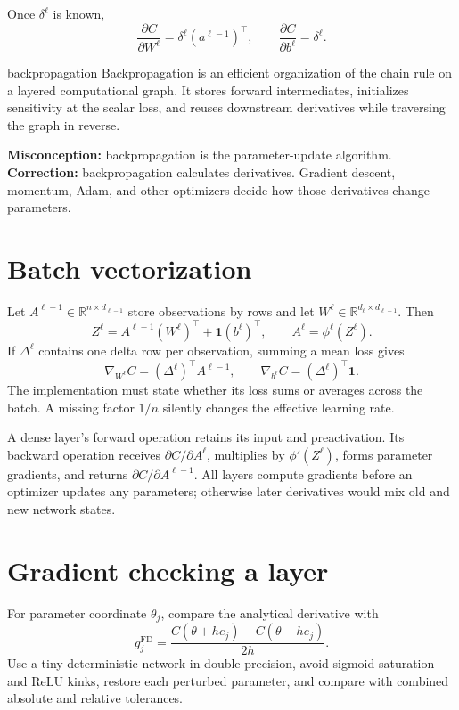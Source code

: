 Once $\delta^\ell$ is known,
\[
  \boxed{
  \frac{\partial C}{\partial W^\ell}
  =\delta^\ell(a^{\ell-1})^\top,
  \qquad
  \frac{\partial C}{\partial b^\ell}=\delta^\ell
  }.
\]

\begin{definitionbox}{backpropagation}
Backpropagation is an efficient organization of the chain rule on a layered
computational graph. It stores forward intermediates, initializes sensitivity
at the scalar loss, and reuses downstream derivatives while traversing the
graph in reverse.
\end{definitionbox}

\begin{misconceptionbox}
\textbf{Misconception:} backpropagation is the parameter-update algorithm.
\textbf{Correction:} backpropagation calculates derivatives. Gradient descent,
momentum, Adam, and other optimizers decide how those derivatives change
parameters.
\end{misconceptionbox}

\section{Batch vectorization}

Let $A^{\ell-1}\in\mathbb R^{n\times d_{\ell-1}}$ store observations by rows
and let $W^\ell\in\mathbb R^{d_\ell\times d_{\ell-1}}$. Then
\[
  Z^\ell=A^{\ell-1}(W^\ell)^\top+\mathbf1(b^\ell)^\top,
  \qquad
  A^\ell=\phi^\ell(Z^\ell).
\]
If $\Delta^\ell$ contains one delta row per observation, summing a mean loss
gives
\[
  \nabla_{W^\ell}C=(\Delta^\ell)^\top A^{\ell-1},
  \qquad
  \nabla_{b^\ell}C=(\Delta^\ell)^\top\mathbf1.
\]
The implementation must state whether its loss sums or averages across the
batch. A missing factor $1/n$ silently changes the effective learning rate.

A dense layer's forward operation retains its input and preactivation. Its
backward operation receives $\partial C/\partial A^\ell$, multiplies by
$\phi'(Z^\ell)$, forms parameter gradients, and returns
$\partial C/\partial A^{\ell-1}$. All layers compute gradients before an
optimizer updates any parameters; otherwise later derivatives would mix old
and new network states.

\section{Gradient checking a layer}

For parameter coordinate $\theta_j$, compare the analytical derivative with
\[
  g_j^{\mathrm{FD}}
  =
  \frac{C(\theta+he_j)-C(\theta-he_j)}{2h}.
\]
Use a tiny deterministic network in double precision, avoid sigmoid saturation
and ReLU kinks, restore each perturbed parameter, and compare with combined
absolute and relative tolerances.

